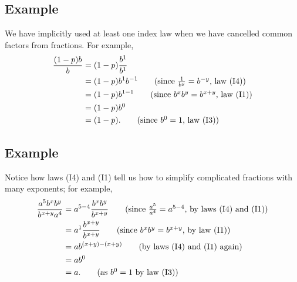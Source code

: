 \subsection{Example}

We have implicitly used at least one index law when we have cancelled common factors from fractions. For example,
\begin{align*}
\frac{(1-p)b}{b} & = (1-p)\frac{b^1}{b^1} \\
		   & = (1-p)b^{1}b^{-1}  \tag{since $\frac{1}{b^y} = b^{-y}$, law (I4)} \\
		   & = (1-p)b^{1-1} \tag{since $b^xb^y = b^{x+y}$, law (I1)} \\
		   & = (1-p)b^0 \\ 
		   & = (1-p). \tag{since $b^0 = 1$, law (I3)}
\end{align*}


\subsection{Example}
Notice how laws (I4) and (I1) tell us how to simplify complicated fractions with many exponents; for example,
\begin{align*}
\frac{a^5b^xb^y}{b^{x+y}a^4} & = a^{5-4}\frac{b^xb^y}{b^{x+y}} \tag{since $\frac{a^5}{a^4} = a^{5-4}$, by laws (I4) and (I1)} \\
						       & = a^1 \frac{b^{x+y}}{b^{x+y}} \tag{since $b^xb^y = b^{x+y}$, by law (I1)} \\
						       & = ab^{(x+y)-(x+y)} \tag{by laws (I4) and (I1) again} \\
						       & = ab^0 \\
						       & = a. \tag{as $b^0 = 1$ by law (I3)}
\end{align*}


